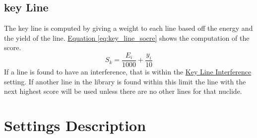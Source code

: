 \documentclass[12pt,report,justified]{SANDreport}
\begin{document}
\section{key Line}\label{sec:key_line}
The key line is computed by giving a weight to each line based off the energy and the yield of the line.
\hyperref[eq:key_line_socre]{Equation \ref{eq:key_line_socre}} shows the computation of the
score.
\begin{equation}
    S_{k} = \frac{E_i}{1000} + \frac{y_i}{10}
    \label{eq:key_line_socre}
\end{equation}
If a line is found to have an interference, that is within the \hyperref[itm:ky_inf]{Key Line Interference} setting.
If another line in the library is found within this limit the line with the next highest score will be used unless
there are no other lines for that nuclide.
    \nocite{*}

    
    


    \appendix
    \chapter{Settings Description}\label{sec:set_desc}
\end{document}
